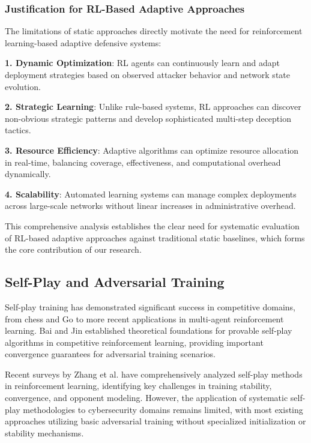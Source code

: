 \documentclass[12pt,oneside]{article}
\begin{document}
\subsubsection{Justification for RL-Based Adaptive Approaches}

The limitations of static approaches directly motivate the need for reinforcement learning-based adaptive defensive systems:

\textbf{1. Dynamic Optimization}: RL agents can continuously learn and adapt deployment strategies based on observed attacker behavior and network state evolution.

\textbf{2. Strategic Learning}: Unlike rule-based systems, RL approaches can discover non-obvious strategic patterns and develop sophisticated multi-step deception tactics.

\textbf{3. Resource Efficiency}: Adaptive algorithms can optimize resource allocation in real-time, balancing coverage, effectiveness, and computational overhead dynamically.

\textbf{4. Scalability}: Automated learning systems can manage complex deployments across large-scale networks without linear increases in administrative overhead.

This comprehensive analysis establishes the clear need for systematic evaluation of RL-based adaptive approaches against traditional static baselines, which forms the core contribution of our research.

\subsection{Self-Play and Adversarial Training}

Self-play training has demonstrated significant success in competitive domains, from chess and Go to more recent applications in multi-agent reinforcement learning. Bai and Jin \cite{bai2020provable} established theoretical foundations for provable self-play algorithms in competitive reinforcement learning, providing important convergence guarantees for adversarial training scenarios.

Recent surveys by Zhang et al. \cite{zhang2024survey} have comprehensively analyzed self-play methods in reinforcement learning, identifying key challenges in training stability, convergence, and opponent modeling. However, the application of systematic self-play methodologies to cybersecurity domains remains limited, with most existing approaches utilizing basic adversarial training without specialized initialization or stability mechanisms.
\end{document}
